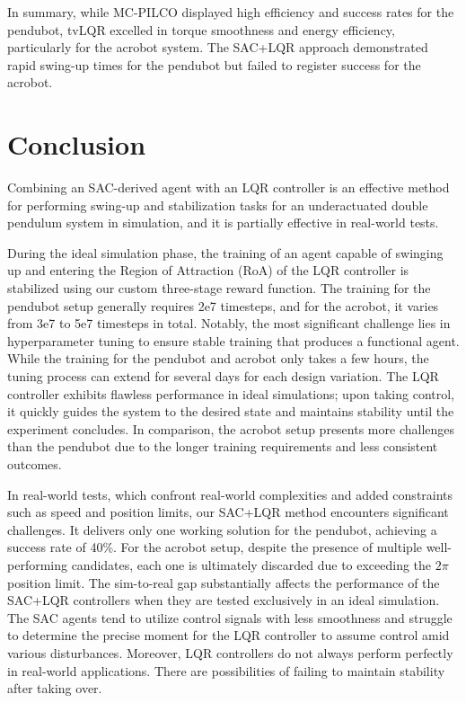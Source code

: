 In summary, while MC-PILCO displayed high efficiency and success rates for the pendubot, tvLQR excelled in torque smoothness and energy efficiency, particularly for the acrobot system. The SAC+LQR approach demonstrated rapid swing-up times for the pendubot but failed to register success for the acrobot.

\section{Conclusion}
Combining an SAC-derived agent with an LQR controller is an effective method for performing swing-up and stabilization tasks for an underactuated double pendulum system in simulation, and it is partially effective in real-world tests.

During the ideal simulation phase, the training of an agent capable of swinging up and entering the Region of Attraction (RoA) of the LQR controller is stabilized using our custom three-stage reward function. The training for the pendubot setup generally requires 2e7 timesteps, and for the acrobot, it varies from 3e7 to 5e7 timesteps in total. Notably, the most significant challenge lies in hyperparameter tuning to ensure stable training that produces a functional agent. While the training for the pendubot and acrobot only takes a few hours, the tuning process can extend for several days for each design variation. The LQR controller exhibits flawless performance in ideal simulations; upon taking control, it quickly guides the system to the desired state and maintains stability until the experiment concludes. In comparison, the acrobot setup presents more challenges than the pendubot due to the longer training requirements and less consistent outcomes.

In real-world tests, which confront real-world complexities and added constraints such as speed and position limits, our SAC+LQR method encounters significant challenges. It delivers only one working solution for the pendubot, achieving a success rate of 40\%. For the acrobot setup, despite the presence of multiple well-performing candidates, each one is ultimately discarded due to exceeding the \(2\pi\) position limit. The sim-to-real gap substantially affects the performance of the SAC+LQR controllers when they are tested exclusively in an ideal simulation. The SAC agents tend to utilize control signals with less smoothness and struggle to determine the precise moment for the LQR controller to assume control amid various disturbances. Moreover, LQR controllers do not always perform perfectly in real-world applications. There are possibilities of failing to maintain stability after taking over.

